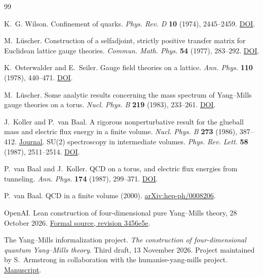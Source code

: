\documentclass[11pt,a4paper]{article}
\numberwithin{equation}{section}
\begin{document}
\begin{thebibliography}{99}
\raggedright
\setlength{\itemsep}{.25\baselineskip}

K.~G. Wilson.
Confinement of quarks.
\emph{Phys. Rev. D} \textbf{10} (1974), 2445--2459.
\href{https://doi.org/10.1103/PhysRevD.10.2445}{DOI}.

M.~L\"uscher.
Construction of a selfadjoint, strictly positive transfer matrix for Euclidean lattice gauge theories.
\emph{Commun. Math. Phys.} \textbf{54} (1977), 283--292.
\href{https://doi.org/10.1007/BF01614090}{DOI}.

K.~Osterwalder and E.~Seiler.
Gauge field theories on a lattice.
\emph{Ann. Phys.} \textbf{110} (1978), 440--471.
\href{https://doi.org/10.1016/0003-4916(78)90039-8}{DOI}.

M.~L\"uscher.
Some analytic results concerning the mass spectrum of Yang--Mills gauge theories on a torus.
\emph{Nucl. Phys. B} \textbf{219} (1983), 233--261.
\href{https://doi.org/10.1016/0550-3213(83)90436-4}{DOI}.

J.~Koller and P.~van Baal.
A rigorous nonperturbative result for the glueball mass and electric flux energy in a finite volume.
\emph{Nucl. Phys. B} \textbf{273} (1986), 387--412.
\href{https://www.sciencedirect.com/science/article/pii/055032138690252X}{Journal}.
\newblock
SU(2) spectroscopy in intermediate volumes.
\emph{Phys. Rev. Lett.} \textbf{58} (1987), 2511--2514.
\href{https://doi.org/10.1103/PhysRevLett.58.2511}{DOI}.

P.~van Baal and J.~Koller.
QCD on a torus, and electric flux energies from tunneling.
\emph{Ann. Phys.} \textbf{174} (1987), 299--371.
\href{https://doi.org/10.1016/0003-4916(87)90032-7}{DOI}.

P.~van Baal.
QCD in a finite volume (2000).
\href{https://arxiv.org/abs/hep-ph/0008206}{arXiv:hep-ph/0008206}.

OpenAI.
Lean construction of four-dimensional pure Yang--Mills theory, 28 October 2026.
\href{https://github.com/yang-mills-group/OpenAI-YM-20261028/tree/3456e5e}{Formal source, revision 3456e5e}.

The Yang--Mills informalization project.
\emph{The construction of four-dimensional quantum Yang--Mills theory}.
Third draft, 13 November 2026.
Project maintained by S.~Armstrong in collaboration with the humanise-yang-mills project.
\href{https://mgubi.org/yang-mills-informalization/manuscript/main.html}{Manuscript}.


\end{thebibliography}
\end{document}
